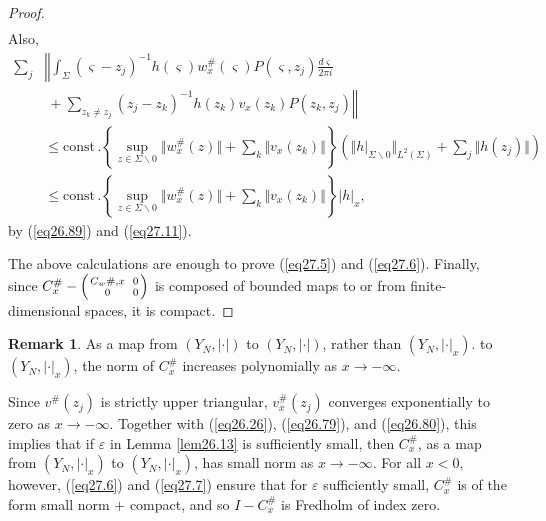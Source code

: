 \documentclass{surv-l}
\theoremstyle{plain}
\theoremstyle{definition}
\newtheorem{remark}[theorem]{Remark}
\numberwithin{equation}{chapter}
\begin{document}
\begin{proof}
\begin{align*}
\end{align*}
Also,
\begin{align*}
\sum_{j}&\left\Vert\int_{\Sigma}(\varsigma-z_{j})^{-1}h(\varsigma)w_{x}^{\#} (\varsigma)P(\varsigma,z_{j})\frac{d\varsigma}{2\pi i}\right.\\
&\left.\ +\sum_{z_{k}\neq z_{j}}(z_{j}-z_{k})^{-1}h(z_{k})v_{x}(z_{k})P(z_{k}, z_{j})\right\Vert\\
&\leq\mathrm{const}\,.\left\{\sup_{z\in\Sigma\backslash 0}\Vert w_{x}^{\#}(z)\Vert+\sum_{k}\Vert v_{x}(z_{k})\Vert\right\}\left(\Vert h|_{\Sigma\backslash 0}\Vert_{L^{2}(\Sigma)}+\sum_{j}\Vert h(z_{j})\Vert\right)\\
&\leq \mathrm{const}\,.\left\{\sup_{z\in\Sigma\backslash 0}\Vert w_{x}^{\#}(z)\Vert+\sum_{k}\Vert v_{x}(z_{k})\Vert\right\}|h|_{x},
\end{align*}
by (\ref{eq26.89}) and (\ref{eq27.11}).

The above calculations are enough to prove (\ref{eq27.5}) and (\ref{eq27.6}). Finally, since $C_{x}^{\#}- \left(
{C_{w}\#,x\atop 0}\ {0\atop 0}\right)$ is composed of bounded maps to or from finite-dimensional spaces, it is compact.
\end{proof}

\setcounter{theorem}{11}
\begin{remark}\label{rem27.12} As a map from $(Y_{N}, |\cdot|)$ to $(Y_{N}, |\cdot|)$, rather than $(Y_{N}, |\cdot|_{x})$. to $(Y_{N}, |\cdot|_{x})$, the norm of $C_{x}^{\#}$ increases polynomially as $ x\rightarrow-\infty$.

Since $v^{\#}(z_{j})$ is strictly upper triangular, $v_{x}^{\#}(z_{j})$ converges exponentially to zero as $x \rightarrow-\infty$. Together with (\ref{eq26.26}), (\ref{eq26.79}), and (\ref{eq26.80}), this implies that if $\varepsilon$ in Lemma \ref{lem26.13} is sufficiently small, then $C_{x}^{\#}$, as a map from $(Y_{N}, |\cdot|_{x})$ to $(Y_{N}, |\cdot|_{x})$, has small norm as $x \rightarrow-\infty$. For all $x<0$, however, (\ref{eq27.6}) and (\ref{eq27.7}) ensure that for $\varepsilon$ sufficiently small, $ C_{x}^{\#}$ is of the form small norm $+$ compact, and so $I-C_{x}^{\#}$ is Fredholm of index zero.
\end{remark}
\end{document}
